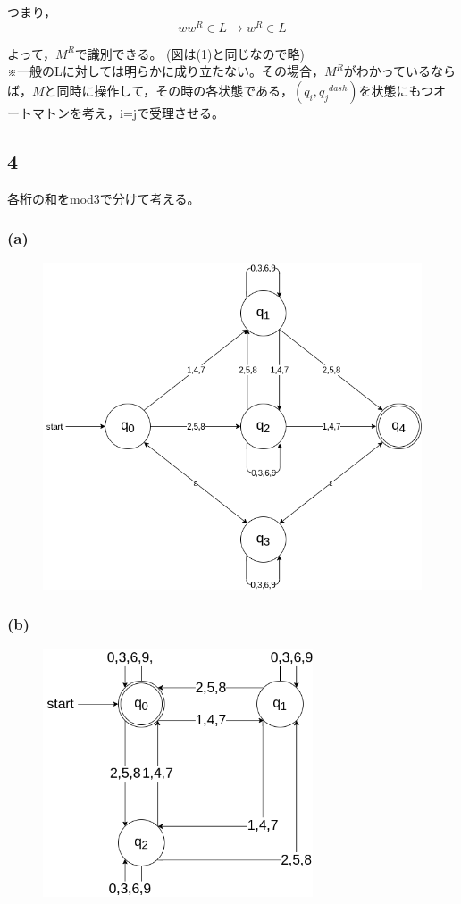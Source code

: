 \documentclass[a4paper,12pt]{jsarticle}
\begin{document}
つまり，\[ww^R\in L \rightarrow w^R\in L\]

よって，$M^R$で識別できる。
(図は(1)と同じなので略)\\
※一般のLに対しては明らかに成り立たない。その場合，$M^R$がわかっているならば，$M$と同時に操作して，その時の各状態である，$(q_i, {q_j}^{dash})$を状態にもつオートマトンを考え，i=jで受理させる。

\newpage

\subsection*{4}
各桁の和をmod3で分けて考える。
\subsubsection*{(a)}
\begin{figure}[htb]
  \begin{center}
  \includegraphics[width=\linewidth]{4-a.png}
  \end{center}
\end{figure}

\newpage
\subsubsection*{(b)}
\begin{figure}[htb]
  \begin{center}
  \includegraphics[width=8cm]{4-b.png}
  \end{center}
\end{figure}
\end{document}
